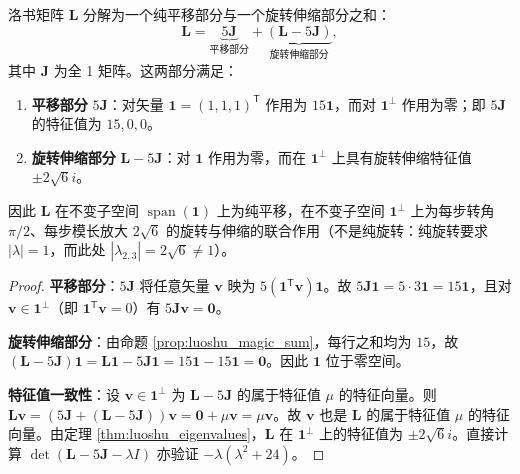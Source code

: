 \begin{theorem}\label{thm:luoshu_decomposition}
洛书矩阵 $\mathbf{L}$ 分解为一个纯平移部分与一个旋转伸缩部分之和：
\[
\mathbf{L} = \underbrace{5\mathbf{J}}_{\text{平移部分}} + \underbrace{(\mathbf{L} - 5\mathbf{J})}_{\text{旋转伸缩部分}},
\]
其中 $\mathbf{J}$ 为全 1 矩阵。这两部分满足：
\begin{enumerate}[label=(\roman*)]
    \item \textbf{平移部分} $5\mathbf{J}$：对矢量 $\mathbf{1} = (1,1,1)^{\mathsf T}$ 作用为 $15\mathbf{1}$，而对 $\mathbf{1}^\perp$ 作用为零；即 $5\mathbf{J}$ 的特征值为 $15, 0, 0$。
    \item \textbf{旋转伸缩部分} $\mathbf{L} - 5\mathbf{J}$：对 $\mathbf{1}$ 作用为零，而在 $\mathbf{1}^\perp$ 上具有旋转伸缩特征值 $\pm 2\sqrt{6}i$。
\end{enumerate}
因此 $\mathbf{L}$ 在不变子空间 $\operatorname{span}(\mathbf{1})$ 上为纯平移，在不变子空间 $\mathbf{1}^\perp$ 上为每步转角 $\pi/2$、每步模长放大 $2\sqrt{6}$ 的旋转与伸缩的联合作用（不是纯旋转：纯旋转要求 $|\lambda|=1$，而此处 $|\lambda_{2,3}|=2\sqrt{6}\ne1$）。
\end{theorem}

\begin{proof}
\textbf{平移部分}：$5\mathbf{J}$ 将任意矢量 $\mathbf{v}$ 映为 $5(\mathbf{1}^{\mathsf T}\mathbf{v})\mathbf{1}$。故 $5\mathbf{J}\mathbf{1} = 5 \cdot 3\mathbf{1} = 15\mathbf{1}$，且对 $\mathbf{v} \in \mathbf{1}^\perp$（即 $\mathbf{1}^{\mathsf T}\mathbf{v} = 0$）有 $5\mathbf{J}\mathbf{v} = \mathbf{0}$。

\textbf{旋转伸缩部分}：由命题 \ref{prop:luoshu_magic_sum}，每行之和均为 $15$，故 $(\mathbf{L} - 5\mathbf{J})\mathbf{1} = \mathbf{L}\mathbf{1} - 5\mathbf{J}\mathbf{1} = 15\mathbf{1} - 15\mathbf{1} = \mathbf{0}$。因此 $\mathbf{1}$ 位于零空间。

\textbf{特征值一致性}：设 $\mathbf{v} \in \mathbf{1}^\perp$ 为 $\mathbf{L} - 5\mathbf{J}$ 的属于特征值 $\mu$ 的特征向量。则 $\mathbf{L}\mathbf{v} = (5\mathbf{J} + (\mathbf{L} - 5\mathbf{J}))\mathbf{v} = \mathbf{0} + \mu\mathbf{v} = \mu\mathbf{v}$。故 $\mathbf{v}$ 也是 $\mathbf{L}$ 的属于特征值 $\mu$ 的特征向量。由定理 \ref{thm:luoshu_eigenvalues}，$\mathbf{L}$ 在 $\mathbf{1}^\perp$ 上的特征值为 $\pm 2\sqrt{6}i$。直接计算 $\det(\mathbf{L} - 5\mathbf{J} - \lambda I)$ 亦验证 $-\lambda(\lambda^2 + 24)$。
\end{proof}

